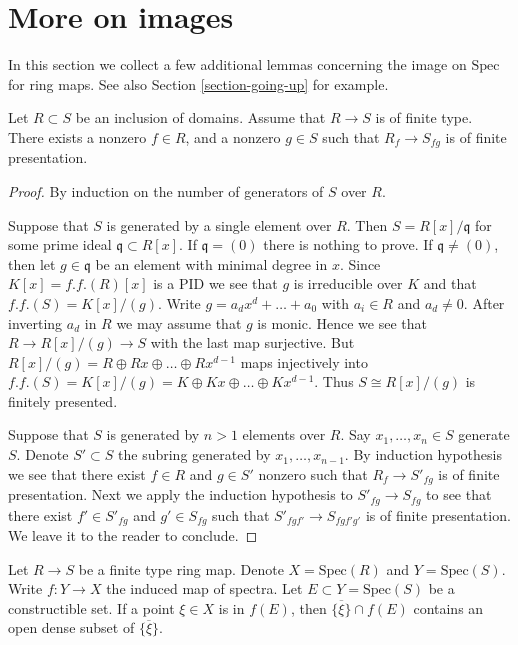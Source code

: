 \section{More on images}
\label{section-more-images}

\noindent
In this section we collect a few additional lemmas concerning the image
on $\text{Spec}$ for ring maps. See also Section \ref{section-going-up}
for example.

\begin{lemma}
\label{lemma-generic-finite-presentation}
Let $R \subset S$ be an inclusion of domains.
Assume that $R \to S$ is of finite type.
There exists a nonzero $f \in R$, and a nonzero $g \in S$
such that $R_f \to S_{fg}$ is of finite presentation.
\end{lemma}

\begin{proof}
By induction on the number of generators of
$S$ over $R$.

\medskip\noindent
Suppose that $S$ is generated by a single element
over $R$. Then $S = R[x]/\mathfrak q$ for some
prime ideal $\mathfrak q \subset R[x]$. If $\mathfrak q = (0)$
there is nothing to prove. If $\mathfrak q \not = (0)$,
then let $g \in \mathfrak q$ be an element with minimal
degree in $x$. Since $K[x] = f.f.(R)[x]$ is a PID we see that
$g$ is irreducible over $K$ and that $f.f.(S) = K[x]/(g)$.
Write $g = a_d x^d + \ldots + a_0$
with $a_i \in R$ and $a_d \not = 0$. After inverting $a_d$
in $R$ we may assume that $g$ is monic. Hence we see that
$R \to R[x]/(g) \to S$ with the last map surjective.
But $R[x]/(g) = R \oplus Rx \oplus \ldots \oplus Rx^{d-1}$
maps injectively into $f.f.(S) = K[x]/(g) = K \oplus Kx \oplus
\ldots \oplus Kx^{d-1}$. Thus $S \cong R[x]/(g)$ is finitely
presented.

\medskip\noindent
Suppose that $S$ is generated by $n > 1$ elements over $R$.
Say $x_1, \ldots, x_n \in S$ generate $S$. Denote $S' \subset S$
the subring generated by $x_1, \ldots, x_{n-1}$. By induction
hypothesis we see that there exist $f\in R$ and $g \in S'$
nonzero such that $R_f \to S'_{fg}$ is of finite presentation.
Next we apply the induction hypothesis to $S'_{fg} \to S_{fg}$
to see that there exist $f' \in S'_{fg}$ and
$g' \in S_{fg}$ such that $S'_{fgf'} \to S_{fgf'g'}$
is of finite presentation. We leave it to the reader to conclude.
\end{proof}

\begin{lemma}
\label{lemma-characterize-image-finite-type}
Let $R \to S$ be a finite type ring map.
Denote $X = \text{Spec}(R)$ and $Y = \text{Spec}(S)$.
Write $f : Y \to X$ the induced
map of spectra. Let $E \subset Y = \text{Spec}(S)$ be a
constructible set.
If a point $\xi \in X$ is in $f(E)$, then
$\overline{\{\xi\}} \cap f(E)$ contains an open
dense subset of $\overline{\{\xi\}}$.
\end{lemma}

